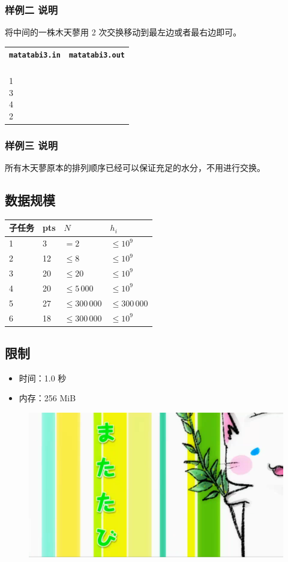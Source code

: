 \documentclass[UTF8, 11pt, a4paper]{article}
\begin{document}
\subsubsection*{样例二 说明}
将中间的一株木天蓼用 2 次交换移动到最左边或者最右边即可。
\newline\newline

\begin{table}[h]\centering
\begin{tabularx}{0.8 \textwidth}{|X|X|}
\hline
\texttt{\textbf{matatabi3.in}} & \texttt{\textbf{matatabi3.out}} \\ \hline
{\ttfamily
4\newline
1\newline
3\newline
4\newline
2
} & {\ttfamily
0
}
\\ \hline
\end{tabularx}\end{table}
\subsubsection*{样例三 说明}
所有木天蓼原本的排列顺序已经可以保证充足的水分，不用进行交换。
\newline\newline

\subsection*{数据规模}
\begin{table}[h]\centering
\begin{tabularx}{0.75 \textwidth}{X|X|X|X}
子任务 & pts & $N$             & $h_i$       \\ \hline\hline
1      & 3   & $= 2$           & $\leq 10^9$ \\ \hline
2      & 12  & $\leq 8$        & $\leq 10^9$ \\ \hline
3      & 20  & $\leq 20$       & $\leq 10^9$ \\ \hline
4      & 20  & $\leq 5\,000$   & $\leq 10^9$ \\ \hline
5      & 27  & $\leq 300\,000$ & $\leq 300\,000$ \\ \hline
6      & 18  & $\leq 300\,000$ & $\leq 10^9$ \\
\end{tabularx}\end{table}

\subsection*{限制}
\begin{itemize}
\item 时间：1.0 秒
\item 内存：256 MiB
\end{itemize}

\begin{figure}[h]\centering
\includegraphics[width=0.6 \textwidth]{matatabi.png}
\end{figure}
\end{document}
